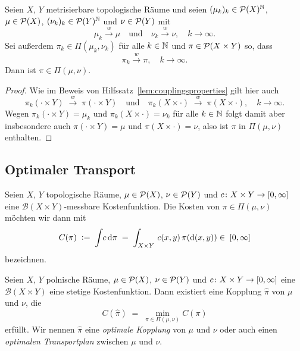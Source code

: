 \documentclass[../main/main.tex]{subfiles}
\begin{document}
	\begin{Hilfssatz}
		\label{lem:convimpliescouplingsconv}
		Seien $X$, $Y$ metrisierbare topologische Räume und seien $(\mu_k)_k \in \mathcal{P}(X)^{\mathbb{N}}$, $\mu \in \mathcal{P}(X)$, $(\nu_k)_k \in \mathcal{P}(Y)^{\mathbb{N}}$ und $\nu \in \mathcal{P}(Y)$ mit
		\[ \mu_k \xrightarrow{w} \mu \quad \text{und} \quad \nu_k \xrightarrow{w} \nu, \quad k \to \infty \text{.} \]
		Sei außerdem $\pi_k \in \Pi(\mu_k, \nu_k)$ für alle $k \in \mathbb{N}$ und $\pi \in \mathcal{P}(X \times Y)$ so, dass
		\[ \pi_k \xrightarrow{w} \pi, \quad k \to \infty \text{.} \]
		Dann ist $\pi \in \Pi(\mu, \nu)$.
	\end{Hilfssatz}

	\begin{proof}
		Wie im Beweis von Hilfssatz~\ref{lem:couplingsproperties} gilt hier auch
		\[ \pi_k(\cdot \times Y) \; \xrightarrow{w} \; \pi(\cdot \times Y) \quad \text{und} \quad \pi_k(X \times \cdot) \; \xrightarrow{w} \; \pi(X \times \cdot), \quad k \to \infty \text{.} \]
		Wegen $\pi_k(\cdot \times Y) = \mu_k$ und $\pi_k(X \times \cdot) = \nu_k$ für alle $k \in \mathbb{N}$ folgt damit aber insbesondere auch $\pi(\cdot \times Y) = \mu$ und $\pi(X \times \cdot) = \nu$, also
		ist $\pi$ in $\Pi(\mu, \nu)$ enthalten.
	\end{proof}

	\subsection{Optimaler Transport}

	\begin{Definition}
		Seien $X$, $Y$ topologische Räume, $\mu \in \mathcal{P}(X)$, $\nu \in \mathcal{P}(Y)$ und $c \colon X \times Y \to [0, \infty]$ eine $\mathcal{B}(X \times Y)$-messbare Kostenfunktion.
		Die Kosten von $\pi \in \Pi(\mu, \nu)$ möchten wir dann mit
		\[ C(\pi) \; \vcentcolon = \; \int_{} \, c \, \mathrm{d}\pi \; = \; \int_{X \times Y} \, c(x, y) \, \pi(\mathrm{d}(x, y)) \in \; [0, \infty] \]
		bezeichnen.
	\end{Definition}

	\begin{Satz}
		\label{thm:existenceoptimaltransportplan}
		Seien $X$, $Y$ polnische Räume, $\mu \in \mathcal{P}(X)$, $\nu \in \mathcal{P}(Y)$ und $c \colon X \times Y \to [0, \infty]$ eine $\mathcal{B}(X \times Y)$ eine stetige 
		Kostenfunktion. Dann existiert eine Kopplung $\hat{\pi}$ von $\mu$ und $\nu$, die 
		\[ C(\hat{\pi}) \; = \; \min_{\pi \in \Pi(\mu, \nu)} C(\pi) \]
		erfüllt. Wir nennen $\hat{\pi}$ eine \emph{optimale Kopplung} von $\mu$ und $\nu$ oder auch einen \emph{optimalen Transportplan} zwischen $\mu$ und $\nu$.
	\end{Satz}
\end{document}
